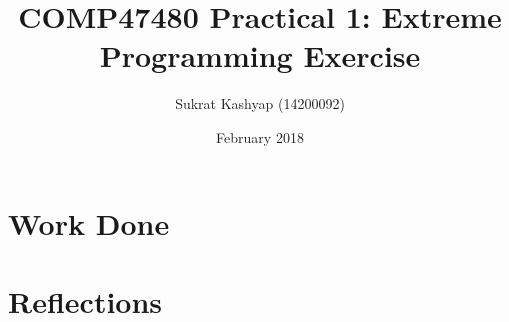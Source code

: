 \documentclass[12pt]{article}
\title{\vspace{-4.0cm}COMP47480 Practical 1: Extreme Programming Exercise}
\author{Sukrat Kashyap (14200092)}
\date{February 2018}
\begin{document}
\maketitle

\section{Work Done}





\section{Reflections}
\end{document}
